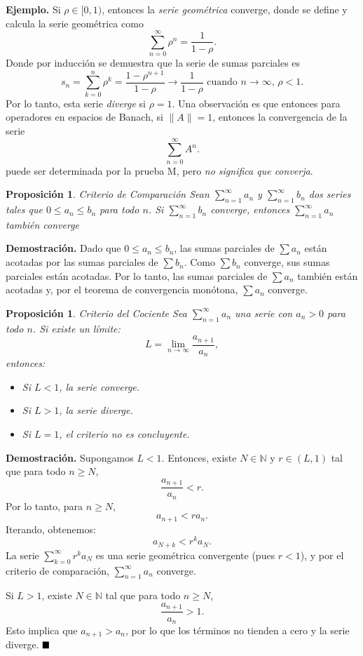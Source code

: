 \documentclass[letterpaper]{book}
\newtheorem{prop}[teorema]{Proposici\'on}
\newcommand{\eje}{{\noindent \sc \textbf{Ejemplo. }}}
\newcommand{\dem}{{\noindent \sc \textbf{Demostraci\'on. }}}
\newcommand{\QED}{\ensuremath{\hspace*{0em plus 1fill}\blacksquare}}
\begin{document}
\eje Si \(\rho\in[0,1)\), entonces la \emph{serie geométrica} converge, donde se define y calcula la serie geométrica como
\[
\sum_{n=0}^{\infty}\rho^n=\frac{1}{1-\rho}.
\]
Donde por inducción se demuestra que la serie de sumas parciales es
\[
s_n=\sum_{k=0}^{n}\rho^k=\frac{1-\rho^{n+1}}{1-\rho}\to\frac{1}{1-\rho}\text{ cuando }n\to\infty,\,\rho<1.
\]
Por lo tanto, esta serie \emph{diverge} si \(\rho=1\). Una observación es que entonces para operadores en espacios de Banach, si \(\|A\|=1\), entonces la convergencia de la serie
\[
\sum_{n=0}^{\infty}A^n.
\]
 puede ser determinada por la prueba M, pero \emph{no significa que converja}.


\begin{prop}{Criterio de Comparación}
Sean \(\sum_{n=1}^\infty a_n\) y \(\sum_{n=1}^\infty b_n\) dos series tales que \(0 \leq a_n \leq b_n\) para todo \(n\). Si \(\sum_{n=1}^\infty b_n\) converge, entonces \(\sum_{n=1}^\infty a_n\) también converge
\end{prop}
\dem Dado que \(0 \leq a_n \leq b_n\), las sumas parciales de \(\sum a_n\) están acotadas por las sumas parciales de \(\sum b_n\). Como \(\sum b_n\) converge, sus sumas parciales están acotadas. Por lo tanto, las sumas parciales de \(\sum a_n\) también están acotadas y, por el teorema de convergencia monótona, \(\sum a_n\) converge.


\begin{prop}{Criterio del Cociente}
Sea \(\sum_{n=1}^\infty a_n\) una serie con \(a_n > 0\) para todo \(n\). Si existe un límite:
    \[
    L = \lim_{n \to \infty} \frac{a_{n+1}}{a_n},
    \]
entonces:
\begin{itemize}
    \item Si \(L < 1\), la serie converge.
    \item Si \(L > 1\), la serie diverge.
    \item Si \(L = 1\), el criterio no es concluyente.
\end{itemize}
\end{prop}
\dem Supongamos \(L < 1\). Entonces, existe \(N \in \mathbb{N}\) y \(r \in (L, 1)\) tal que para todo \(n \geq N\),
    \[
    \frac{a_{n+1}}{a_n} < r.
    \]
    Por lo tanto, para \(n \geq N\),
    \[
    a_{n+1} < r a_n.
    \]
    Iterando, obtenemos:
    \[
    a_{N+k} < r^k a_N.
    \]
    La serie \(\sum_{k=0}^\infty r^k a_N\) es una serie geométrica convergente (pues \(r < 1\)), y por el criterio de comparación, \(\sum_{n=1}^\infty a_n\) converge.

    Si \(L > 1\), existe \(N \in \mathbb{N}\) tal que para todo \(n \geq N\),
    \[
    \frac{a_{n+1}}{a_n} > 1.
    \]
    Esto implica que \(a_{n+1} > a_n\), por lo que los términos no tienden a cero y la serie diverge.
\QED
\end{document}
